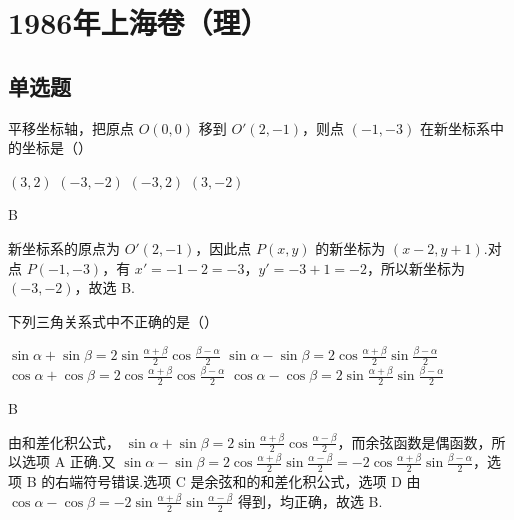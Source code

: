 \documentclass[UTF8,a4paper,oneside,11pt]{ctexbook}
\begin{document}
\mainmatter

\chapter{1986年上海卷（理）}

\section{单选题}

\begin{problem}

平移坐标轴，把原点 \(O(0,0)\) 移到 \(O'(2,-1)\)，则点 \((-1,-3)\) 在新坐标系中的坐标是（\quad）

\choices
    {\(\left( 3,2 \right)\)}
    {\(\left( -3,-2 \right)\)}
    {\(\left( -3,2 \right)\)}
    {\(\left( 3,-2 \right)\)}
\end{problem}

\begin{answer}
B
\end{answer}

\begin{solution}
新坐标系的原点为 \(O'(2,-1)\)，因此点 \(P(x,y)\) 的新坐标为
\(\left(x-2,y+1\right)\).对点 \(P(-1,-3)\)，有
\(x'=-1-2=-3\)，\(y'=-3+1=-2\)，所以新坐标为
\(\left(-3,-2\right)\)，故选 B.
\end{solution}

\begin{problem}

下列三角关系式中不正确的是（\quad）

\choices
    {\(\sin\alpha+\sin\beta=2\sin \frac{\alpha+\beta}{2}\cos \frac{\beta-\alpha}{2}\)}
    {\(\sin\alpha-\sin\beta=2\cos \frac{\alpha+\beta}{2}\sin \frac{\beta-\alpha}{2}\)}
    {\(\cos\alpha+\cos\beta=2\cos \frac{\alpha+\beta}{2}\cos \frac{\beta-\alpha}{2}\)}
    {\(\cos\alpha-\cos\beta=2\sin \frac{\alpha+\beta}{2}\sin \frac{\beta-\alpha}{2}\)}
\end{problem}

\begin{answer}
B
\end{answer}

\begin{solution}
由和差化积公式，
\(\sin\alpha+\sin\beta=2\sin\frac{\alpha+\beta}{2}\cos\frac{\alpha-\beta}{2}\)，而余弦函数是偶函数，所以选项 A 正确.又
\(\sin\alpha-\sin\beta=2\cos\frac{\alpha+\beta}{2}\sin\frac{\alpha-\beta}{2}=-2\cos\frac{\alpha+\beta}{2}\sin\frac{\beta-\alpha}{2}\)，选项 B 的右端符号错误.选项 C 是余弦和的和差化积公式，选项 D 由
\(\cos\alpha-\cos\beta=-2\sin\frac{\alpha+\beta}{2}\sin\frac{\alpha-\beta}{2}\) 得到，均正确，故选 B.
\end{solution}
\end{document}
